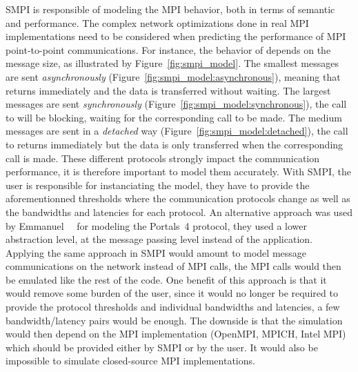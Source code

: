         SMPI is responsible of modeling the MPI behavior, both in terms of semantic and performance. The complex network
        optimizations done in real MPI implementations need to be considered when predicting the performance of MPI
        point-to-point communications. For instance, the behavior of \send depends on the message size, as illustrated
        by Figure~\ref{fig:smpi_model}. The smallest messages are sent \emph{asynchronously}
        (Figure~\ref{fig:smpi_model:asynchronous}), meaning that \send returns immediately and the data is transferred
        without waiting. The largest messages are sent \emph{synchronously} (Figure~\ref{fig:smpi_model:synchronous}),
        \ie the call to \send will be blocking, waiting for the corresponding \recv call to be made. The medium messages
        are sent in a \emph{detached} way (Figure~\ref{fig:smpi_model:detached}), the call to \send returns immediately
        but the data is only transferred when the corresponding \recv call is made.  These different protocols strongly
        impact the communication performance, it is therefore important to model them accurately. With SMPI, the user is
        responsible for instanciating the model, \ie they have to provide the aforementionned thresholds where the
        communication protocols change as well as the bandwidths and latencies for each protocol.  An alternative
        approach was used by Emmanuel~\etal~\cite{emmanuel:hal-02972297} for modeling the Portals~4 protocol, they used
        a lower abstraction level, at the message passing level instead of the application. Applying the same approach
        in SMPI would amount to model message communications on the network instead of MPI calls, the MPI calls would
        then be emulated like the rest of the code. One benefit of this approach is that it would remove some burden of
        the user, since it would no longer be required to provide the protocol thresholds and individual bandwidths and
        latencies, a few bandwidth/latency pairs would be enough. The downside is that the simulation would then
        depend on the MPI implementation (\eg OpenMPI, MPICH, Intel MPI) which should be provided either by SMPI or by
        the user. It would also be impossible to simulate closed-source MPI implementations.

